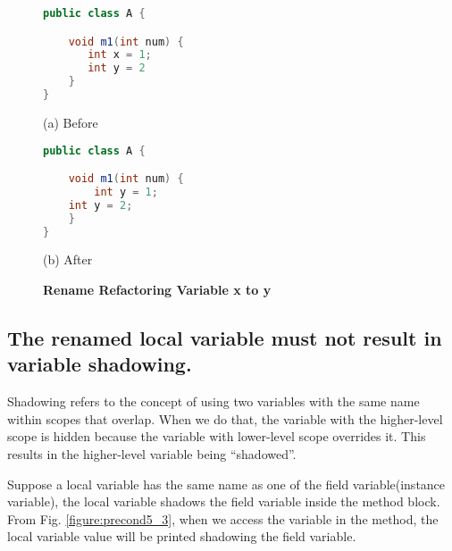 \begin{figure}[th]
\centering
\begin{minipage}[t]{0.45\linewidth}
\begin{lstlisting}[language=java, basicstyle=\scriptsize\ttfamily,frame=single]
public class A {

    void m1(int num) {
       int x = 1; 
       int y = 2
    }
}
\end{lstlisting}
\centering(a) Before 
\end{minipage}
\hfill
\begin{minipage}[t]{0.45\linewidth}
\begin{lstlisting}[language=java, basicstyle=\scriptsize\ttfamily,frame=single]
public class A {

    void m1(int num) {
        int y = 1; 
	int y = 2;
    }
}
\end{lstlisting}
\centering(b) After 
\end{minipage}
\caption{\textbf{Rename Refactoring Variable x to y}}
\label{figure:precond5_2}
\end{figure}

\subsection{The renamed local variable must not result in variable shadowing.}
Shadowing refers to the concept of using two variables with the same name within scopes that overlap. When we do that, the variable with the higher-level scope is hidden because the variable with lower-level scope overrides it. This results in the higher-level variable being ``shadowed''. 


Suppose a local variable has the same name as one of the field variable(instance variable), the local variable shadows the field variable inside the method block. From Fig. \ref{figure:precond5_3}, when we access the variable in the method, the local variable value will be printed shadowing the field variable.

